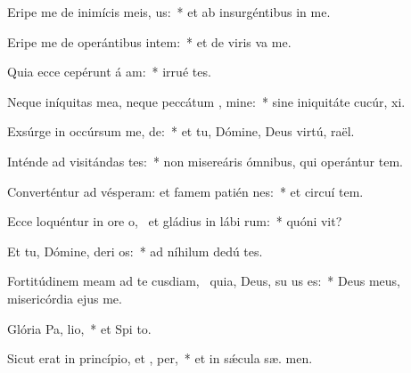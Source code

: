 \item Eripe me de inimícis meis,  us:~* et ab insurgéntibus in   me.
\item Eripe me de operántibus intem:~* et de viris  va me.
\item Quia ecce cepérunt á am:~* irrué   tes.
\item Neque iníquitas mea, neque peccátum , mine:~* sine iniquitáte cucúr,  xi.
\item Exsúrge in occúrsum me,  de:~* et tu, Dómine, Deus virtú,  raël.
\item Inténde ad visitándas  tes:~* non misereáris ómnibus, qui operántur tem.
\item Converténtur ad vésperam: et famem patién  nes:~* et circuí tem.
\item Ecce loquéntur in ore o,~\pscross{} et gládius in lábi rum:~* quóni  vit?
\item Et tu, Dómine, deri os:~* ad níhilum dedú  tes.
\item Fortitúdinem meam ad te cusdiam,~\pscross{} quia, Deus, su us es:~* Deus meus, misericórdia ejus  me.
\item Glória Pa,  lio,~* et Spi to.
\item Sicut erat in princípio, et ,  per,~* et in sǽcula sæ. men.

